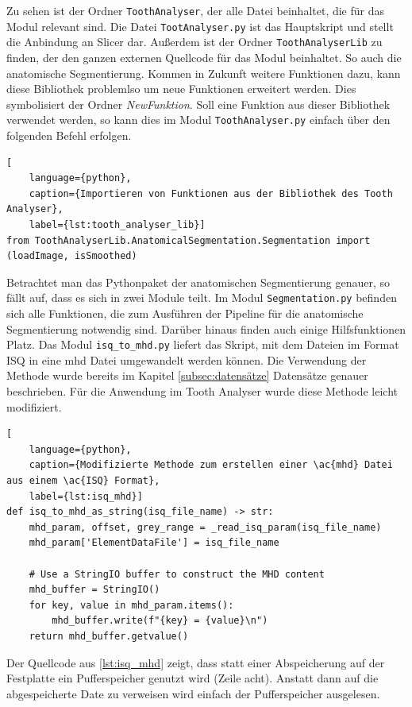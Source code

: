 Zu sehen ist der Ordner \texttt{ToothAnalyser}, der alle Datei beinhaltet, die für
das Modul relevant sind. Die Datei \texttt{TootAnalyser.py} ist das Hauptskript und
stellt die Anbindung an Slicer dar. Außerdem ist der Ordner \texttt{ToothAnalyserLib}
zu finden, der den ganzen externen Quellcode für das Modul beinhaltet. So auch die
anatomische Segmentierung. Kommen in Zukunft weitere Funktionen dazu, kann diese
Bibliothek problemlso um neue Funktionen erweitert werden. Dies symbolisiert der
Ordner \textsl{NewFunktion}. Soll eine Funktion aus dieser Bibliothek verwendet
werden, so kann dies im Modul \texttt{ToothAnalyser.py} einfach über den
folgenden Befehl erfolgen.

\begin{lstlisting}[
    language={python},
    caption={Importieren von Funktionen aus der Bibliothek des Tooth Analyser},
    label={lst:tooth_analyser_lib}]
from ToothAnalyserLib.AnatomicalSegmentation.Segmentation import (loadImage, isSmoothed)
\end{lstlisting}

Betrachtet man das Pythonpaket der anatomischen Segmentierung genauer, so fällt
auf, dass es sich in zwei Module teilt. Im Modul \texttt{Segmentation.py} befinden
sich alle Funktionen, die zum Ausführen der Pipeline für die anatomische
Segmentierung notwendig sind. Darüber hinaus finden auch einige Hilfsfunktionen Platz.
Das Modul \texttt{isq\_to\_mhd.py} liefert das Skript, mit dem Dateien im Format
\ac{ISQ} in eine \ac{mhd} Datei umgewandelt werden können. Die Verwendung der Methode
wurde bereits im Kapitel \ref{subsec:datensätze} Datensätze genauer beschrieben.
Für die Anwendung im Tooth Analyser wurde diese Methode leicht modifiziert.

\begin{lstlisting}[
    language={python},
    caption={Modifizierte Methode zum erstellen einer \ac{mhd} Datei aus einem \ac{ISQ} Format},
    label={lst:isq_mhd}]
def isq_to_mhd_as_string(isq_file_name) -> str:
    mhd_param, offset, grey_range = _read_isq_param(isq_file_name)
    mhd_param['ElementDataFile'] = isq_file_name

    # Use a StringIO buffer to construct the MHD content
    mhd_buffer = StringIO()
    for key, value in mhd_param.items():
        mhd_buffer.write(f"{key} = {value}\n")
    return mhd_buffer.getvalue()
\end{lstlisting}

Der Quellcode aus \ref{lst:isq_mhd} zeigt, dass statt einer Abspeicherung auf
der Festplatte ein Pufferspeicher genutzt wird (Zeile acht). Anstatt dann auf die
abgespeicherte Date zu verweisen wird einfach der Pufferspeicher ausgelesen.


